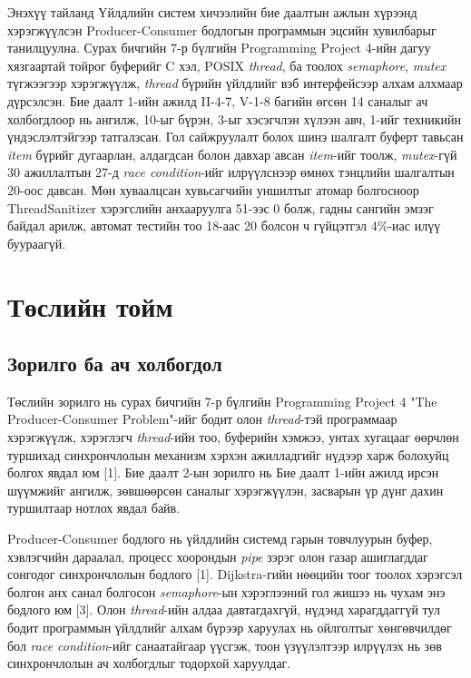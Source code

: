 \documentclass[12pt,a4paper]{article}
\newcommand{\term}[1]{\textit{#1}} %
\begin{document}
\makecover


Энэхүү тайланд Үйлдлийн систем хичээлийн бие даалтын ажлын хүрээнд хэрэгжүүлсэн Producer-Consumer бодлогын программын эцсийн хувилбарыг танилцуулна. Сурах бичгийн 7-р бүлгийн Programming Project 4-ийн дагуу хязгаартай тойрог буферийг C хэл, POSIX \term{thread},  ба  тоолох \term{semaphore}, \term{mutex} түгжээгээр хэрэгжүүлж, \term{thread} бүрийн үйлдлийг вэб интерфейсээр алхам алхмаар дүрсэлсэн. Бие даалт 1-ийн ажилд II-4-7, V-1-8 багийн өгсөн 14 саналыг ач холбогдлоор нь ангилж, 10-ыг бүрэн, 3-ыг хэсэгчлэн хүлээн авч, 1-ийг техникийн үндэслэлтэйгээр татгалзсан. Гол сайжруулалт болох шинэ шалгалт буферт тавьсан \term{item} бүрийг дугаарлан, алдагдсан болон давхар авсан \term{item}-ийг тоолж, \term{mutex}-гүй 30 ажиллалтын 27-д \term{race condition}-ийг илрүүлснээр өмнөх тэнцлийн шалгалтын 20-оос давсан. Мөн хуваалцсан хувьсагчийн уншилтыг атомар болгосноор ThreadSanitizer хэрэгслийн анхааруулга 51-ээс 0 болж, гадны сангийн эмзэг байдал арилж, автомат тестийн тоо 18-аас 20 болсон ч гүйцэтгэл 4\%-иас илүү буураагүй.

\clearpage
\tableofcontents
\clearpage

\section{Төслийн тойм}

\subsection{Зорилго ба ач холбогдол}
Төслийн зорилго нь сурах бичгийн 7-р бүлгийн Programming Project 4 "The Producer-Consumer Problem"-ийг бодит олон \term{thread}-тэй программаар хэрэгжүүлж, хэрэглэгч \term{thread}-ийн тоо, буферийн хэмжээ, унтах хугацааг өөрчлөн туршихад синхрончлолын механизм хэрхэн ажилладгийг нүдээр харж болохуйц болгох явдал юм [1]. Бие даалт 2-ын зорилго нь Бие даалт 1-ийн ажилд ирсэн шүүмжийг ангилж, зөвшөөрсөн саналыг хэрэгжүүлэн, засварын үр дүнг дахин туршилтаар нотлох явдал байв.

Producer-Consumer бодлого нь үйлдлийн системд гарын товчлуурын буфер, хэвлэгчийн дараалал, процесс хоорондын \term{pipe} зэрэг олон газар ашиглагддаг сонгодог синхрончлолын бодлого [1]. Dijkstra-гийн нөөцийн тоог тоолох хэрэгсэл болгон анх санал болгосон \term{semaphore}-ын хэрэглээний гол жишээ нь чухам энэ бодлого юм [3]. Олон \term{thread}-ийн алдаа давтагдахгүй, нүдэнд харагддаггүй тул бодит программын үйлдлийг алхам бүрээр харуулах нь ойлголтыг хөнгөвчилдөг бол \term{race condition}-ийг санаатайгаар үүсгэж, тоон үзүүлэлтээр илрүүлэх нь зөв синхрончлолын ач холбогдлыг тодорхой харуулдаг.
\end{document}

